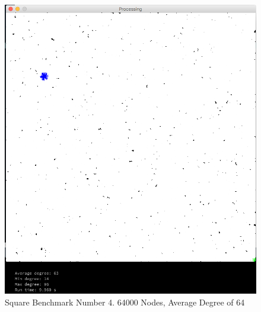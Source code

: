 \documentclass{article}
\begin{document}
\begin{figure}
    \centering
    \includegraphics[scale=0.45]{./images/square_3.png}
    \caption{Square Benchmark Number 4. 64000 Nodes, Average Degree of 64}
    \label{square3}
\end{figure}
\end{document}
